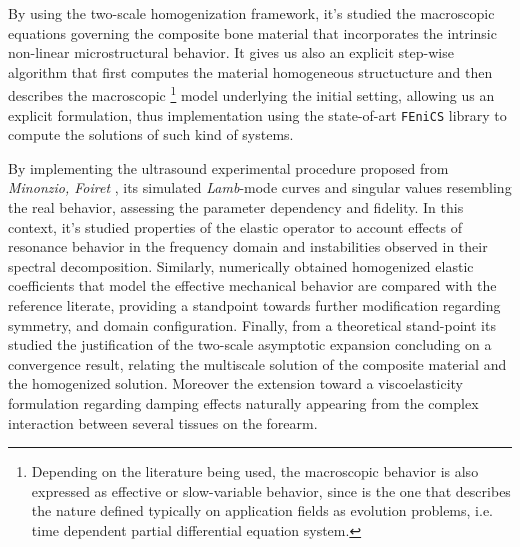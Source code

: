 \begin{intro}
By using the two-scale homogenization framework, it's studied the macroscopic equations governing the composite bone material that incorporates the intrinsic non-linear microstructural behavior.
It gives us also an explicit step-wise algorithm that first computes the material homogeneous structucture and then describes the macroscopic \footnote{Depending on the literature being used, the macroscopic behavior is also expressed as effective or slow-variable behavior, since is the one that describes the nature defined typically on application fields as evolution problems, i.e. time dependent partial differential equation system.} model underlying the initial setting, allowing us an explicit formulation, thus implementation using the state-of-art \texttt{FEniCS} \cite{logg2012automated} library to compute the solutions of such kind of systems.

By implementing the ultrasound experimental procedure proposed from \textit{Minonzio, Foiret} \cite{Foiret2014}, \cite{Minonzio2018} its simulated  \textit{Lamb}-mode curves and singular values resembling the real behavior, assessing the parameter dependency and fidelity. In this context, it's studied properties of the elastic operator to account effects of resonance behavior in the frequency domain and instabilities observed in their spectral decomposition.
Similarly, numerically obtained homogenized elastic coefficients that model the effective mechanical behavior are compared with the reference literate, providing a standpoint towards further modification regarding symmetry, and domain configuration.
Finally, from a theoretical stand-point its studied the justification of the two-scale asymptotic expansion concluding on a convergence result, relating the multiscale solution of the composite material and the homogenized solution. Moreover the extension toward a viscoelasticity formulation regarding damping effects naturally appearing from the complex interaction between several tissues on the forearm.

\end{intro}